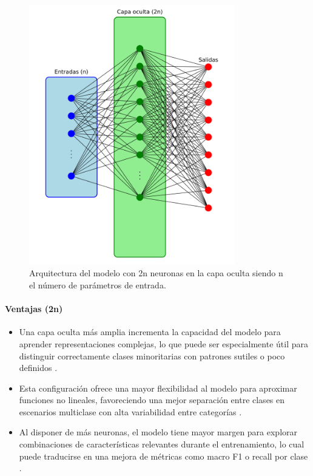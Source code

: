 \begin{figure}[H]
    \centering
    \includegraphics[width=0.8\textwidth]{./img/modelo/arquitecturas/arqnnMUL.pdf}
    \caption{Arquitectura del modelo con 2n neuronas en la capa oculta siendo n el número de parámetros de entrada.}
    \label{fig:arqnnMUL}
\end{figure}

\paragraph{Ventajas (2n)}
\begin{itemize}
	\item Una capa oculta más amplia incrementa la capacidad del modelo para aprender representaciones complejas, lo que puede ser especialmente útil para distinguir correctamente clases minoritarias con patrones sutiles o poco definidos \cite{srivastava2014dropout}.
	\item Esta configuración ofrece una mayor flexibilidad al modelo para aproximar funciones no lineales, favoreciendo una mejor separación entre clases en escenarios multiclase con alta variabilidad entre categorías \cite{bishop2006pattern}.
	\item Al disponer de más neuronas, el modelo tiene mayor margen para explorar combinaciones de características relevantes durante el entrenamiento, lo cual puede traducirse en una mejora de métricas como macro F1 o recall por clase \cite{liu2020deep}.
\end{itemize}

